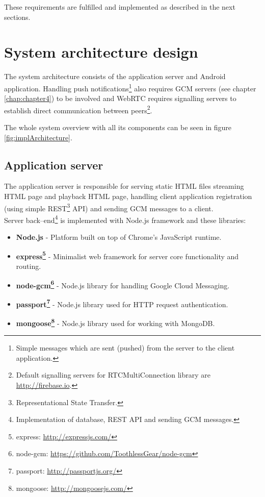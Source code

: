 These requirements are fulfilled and implemented as described in the next sections.

\section{System architecture design}
The system architecture consists of the application server and Android application. Handling push notifications\footnote{Simple messages which are sent (pushed) from the server to the client application.} also requires GCM servers (see chapter \ref{chap:chapter4}) to be involved and WebRTC requires signalling servers to establish direct communication between peers\footnote{Default signalling servers for RTCMultiConnection library are \url{http://firebase.io}.}.

The whole system overview with all its components can be seen in figure \ref{fig:implArchitecture}.


\subsection{Application server}
The application server is responsible for serving static HTML files {streaming HTML page and playback HTML page}, handling client application registration (using simple REST\footnote{Representational State Transfer.} API) and sending GCM messages to a client.\\

\newpage
\noindent
Server back--end\footnote{Implementation of database, REST API and sending GCM messages.} is implemented with Node.js framework and these libraries:
\begin{itemize}
	\item \textbf{Node.js} - Platform built on top of Chrome's JavaScript runtime.
	\item \textbf{express\footnote{express: \url{http://expressjs.com/}}} - Minimalist web framework for server core functionality and routing.
	\item \textbf{node-gcm\footnote{node-gcm: \url{https://github.com/ToothlessGear/node-gcm}}} - Node.js library for handling Google Cloud Messaging.
	\item \textbf{passport\footnote{passport: \url{http://passportjs.org/}}} - Node.js library used for HTTP request authentication.
	\item \textbf{mongoose\footnote{mongoose: \url{http://mongoosejs.com/}}} - Node.js library used for working with MongoDB.
\end{itemize}



